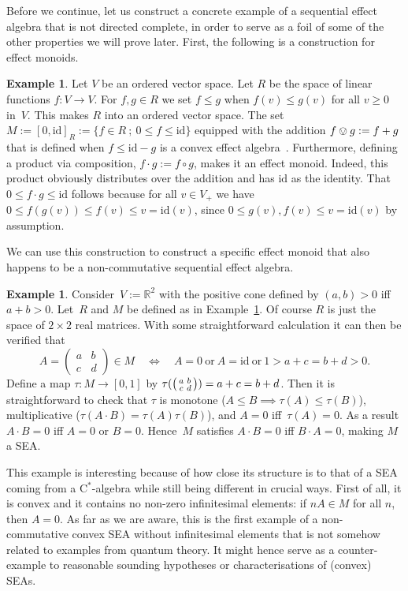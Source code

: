 \documentclass[a4paper, onecolumn, accepted=2020-12-22]{quantumarticle}
\newcommand{\R}{\mathbb{R}}
\newcommand{\id}{\text{id}}
\newcounter{counter}
\theoremstyle{definition}
\newtheorem{example}[counter]{Example}
\begin{document}
Before we continue, let us construct a concrete example of a sequential effect algebra that is not directed complete, in order to serve as a foil of some of the other properties we will prove later. First, the following is a construction for effect monoids.
\begin{example}\label{ex:effect-monoids}
    Let $V$ be an ordered vector space. Let $R$ be the space of linear functions $f:V\rightarrow V$. For $f,g\in R$ we set $f\leq g$ when $f(v)\leq g(v)$ for all $v\geq 0$ in~$V$. This makes $R$ into an ordered vector space. 
    The set $M := [0,\id]_R := \{f\in R~;~ 0\leq f\leq \id\}$ equipped with the addition $f\ovee g := f+g$ that is defined when $f\leq \id-g$ is a convex effect algebra~\cite{gudder1999convex}. Furthermore, defining a product via  composition, $f\cdot g := f\circ g$, makes it an effect monoid.
    Indeed, this product obviously distributes over the addition and has $\id$ as the identity. That $0\leq f\cdot g \leq \id$ follows because for all $v\in V_+$
we have $0\leq f(g(v)) \leq f(v) \leq v = \id(v)$, since $0\leq g(v),f(v)\leq v = \id(v)$ by assumption.
\end{example}
We can use this construction to construct a specific effect monoid that also happens to be a non-commutative sequential effect algebra.
\begin{example}\label{ex:assoc-SEA}
    Consider~$V := \R^2$ with the positive cone defined 
    by $(a,b) > 0$ iff  $a+b > 0$.
    Let~$R$ and $M$ be defined as in Example~\ref{ex:effect-monoids}.
    Of course $R$ is just the space of $2\times 2$ real matrices.
    With some straightforward calculation it can then be verified
    that
\begin{equation*}
    A  =  \begin{pmatrix}
        a&b\\
        c&d
    \end{pmatrix} \in M \quad \iff\quad  A=0 \ \text{or}\ A=\id\  \text{or}\ 1>a+c=b+d>0.
\end{equation*}
    Define a map $\tau: M\rightarrow [0,1]$ by $\tau(\begin{psmallmatrix}a&b\\c&d\end{psmallmatrix}) = a+c=b+d$. Then it is straightforward to check that $\tau$ is monotone ($A\leq B \implies \tau(A)\leq \tau(B)$), multiplicative ($\tau(A\cdot B) = \tau(A)\tau(B)$), and $A=0$ iff~$\tau(A)=0$. As a result $A\cdot B = 0$ iff $A=0$ or $B=0$. Hence~$M$ satisfies $A\cdot B = 0$ iff $B\cdot A = 0$, making $M$ 
        a SEA.
\end{example}
This example is interesting because of how close its structure is to that of a SEA coming from a C$^*$-algebra while still being different in crucial ways. First of all, it is convex and  it contains no non-zero infinitesimal elements: if $n A\in M$ for all $n$, then $A=0$. As far as we are aware, this is the first example of a non-commutative convex SEA without infinitesimal elements that is not somehow related to examples from quantum theory.
It might hence serve as a counter-example to reasonable sounding hypotheses or characterisations of (convex) SEAs.
\end{document}

